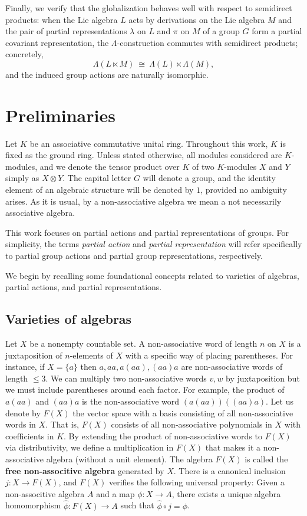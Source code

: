 \documentclass[11pt]{amsart}
\numberwithin{equation}{section}
\theoremstyle{definition}
\theoremstyle{remark}
\begin{document}
Finally, we verify that the globalization behaves well with respect to semidirect products: when  the Lie algebra \(L\) acts by derivations on the Lie algebra \(M\) and the pair of partial representations \(\lambda\) on \(L\) and \(\pi\) on \(M\) of a group $G$ form a partial covariant representation, the \(\Lambda\)-construction commutes  with  semidirect products; concretely,
\[
\Lambda(L\!\ltimes\!M)\ \cong\ \Lambda(L)\!\ltimes\!\Lambda(M),
\]
and the induced group actions are naturally isomorphic.



\section{Preliminaries}

Let \( K \) be  an associative commutative unital ring. Throughout this work, \( K \) is fixed as the ground ring. Unless stated otherwise, all modules considered are \( K \)-modules,  and we denote the tensor  product  over $K$ of
two \(K\)-modules \(X\) and \(Y\) simply as \(X\otimes Y\).  The capital letter \( G \) will denote a group, and the identity element of an algebraic structure will be denoted by \( 1 \), provided no ambiguity arises. As it is usual, by a non-associative algebra we mean a not necessarily associative algebra.

This work focuses on partial actions and partial representations of groups. For simplicity, the terms \emph{partial action} and \emph{partial representation} will refer specifically to partial group actions and partial group representations, respectively. 

We begin by recalling some foundational concepts related to varieties of algebras, partial actions, and partial representations.

\subsection{Varieties of algebras}
Let $X$ be a nonempty countable set. A  non-associative word of length $n$ on $X$  is a juxtaposition of $n$-elements of $X$  with a specific way of placing parentheses. For instance, if $X=\{a\}$ then $a,aa,a(aa),(aa)a$ are non-associative words of length $\leq 3$. We can multiply two  non-associative words $v, w$ by juxtaposition but we must include parentheses around each factor. For example, the product of $a(aa)$ and $(aa)a$ is the non-associative word $(a(aa))((aa)a)$.  Let us denote by $F(X)$  the vector space with a basis consisting of all non-associative words in $X$. That is, $F(X)$ consists of all non-associative polynomials in $X$ with coefficients in $K$. By extending the product of non-associative words to $F(X)$ via distributivity, we define a multiplication in 
$F(X)$ that makes it a non-associative algebra (without a unit element). The algebra $F(X)$ is called the {\bf free non-associtive algebra} generated by $X$. There is a canonical inclusion $j: X\to F(X)$, and $F(X)$ verifies the following universal property: Given a non-associtive algebra $A$ and a  map $\phi:X\to A$, there exists a unique algebra homomorphism $\widehat{\phi}: F(X)\to A$ such that $\widehat{\phi}\circ j=\phi$. 
\end{document}
